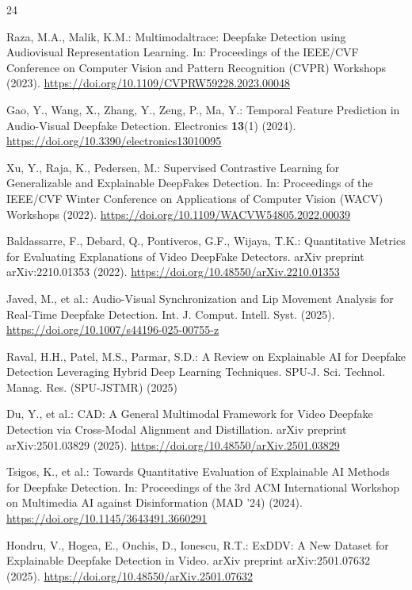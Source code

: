 \documentclass[pdflatex,sn-mathphys-num]{sn-jnl}
\begin{document}
\begin{thebibliography}{24}

Raza, M.A., Malik, K.M.: Multimodaltrace: Deepfake Detection using Audiovisual Representation Learning. In: Proceedings of the IEEE/CVF Conference on Computer Vision and Pattern Recognition (CVPR) Workshops (2023). \url{https://doi.org/10.1109/CVPRW59228.2023.00048}

Gao, Y., Wang, X., Zhang, Y., Zeng, P., Ma, Y.: Temporal Feature Prediction in Audio-Visual Deepfake Detection. Electronics \textbf{13}(1) (2024). \url{https://doi.org/10.3390/electronics13010095}

Xu, Y., Raja, K., Pedersen, M.: Supervised Contrastive Learning for Generalizable and Explainable DeepFakes Detection. In: Proceedings of the IEEE/CVF Winter Conference on Applications of Computer Vision (WACV) Workshops (2022). \url{https://doi.org/10.1109/WACVW54805.2022.00039}

Baldassarre, F., Debard, Q., Pontiveros, G.F., Wijaya, T.K.: Quantitative Metrics for Evaluating Explanations of Video DeepFake Detectors. arXiv preprint arXiv:2210.01353 (2022). \url{https://doi.org/10.48550/arXiv.2210.01353}

Javed, M., et al.: Audio-Visual Synchronization and Lip Movement Analysis for Real-Time Deepfake Detection. Int. J. Comput. Intell. Syst. (2025). \url{https://doi.org/10.1007/s44196-025-00755-z}

Raval, H.H., Patel, M.S., Parmar, S.D.: A Review on Explainable AI for Deepfake Detection Leveraging Hybrid Deep Learning Techniques. SPU-J. Sci. Technol. Manag. Res. (SPU-JSTMR) (2025)

Du, Y., et al.: CAD: A General Multimodal Framework for Video Deepfake Detection via Cross-Modal Alignment and Distillation. arXiv preprint arXiv:2501.03829 (2025). \url{https://doi.org/10.48550/arXiv.2501.03829}

Tsigos, K., et al.: Towards Quantitative Evaluation of Explainable AI Methods for Deepfake Detection. In: Proceedings of the 3rd ACM International Workshop on Multimedia AI against Disinformation (MAD '24) (2024). \url{https://doi.org/10.1145/3643491.3660291}

Hondru, V., Hogea, E., Onchis, D., Ionescu, R.T.: ExDDV: A New Dataset for Explainable Deepfake Detection in Video. arXiv preprint arXiv:2501.07632 (2025). \url{https://doi.org/10.48550/arXiv.2501.07632}


\end{thebibliography}
\end{document}
